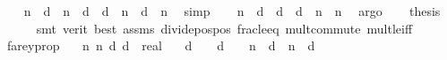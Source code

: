 \begin{isabellebody}
\ \ \isamarkupfalse%
\ {\isachardoublequoteopen}n{}\ {\isacharasterisk}{\kern0pt}\ d{}\ {\isacharplus}{\kern0pt}\ n{}\ {\isacharasterisk}{\kern0pt}\ d{}\ {\isacharless}{\kern0pt}\ d{}\ {\isacharasterisk}{\kern0pt}\ n{}\ {\isacharplus}{\kern0pt}\ d{}\ {\isacharasterisk}{\kern0pt}\ n{}{\isachardoublequoteclose}\ \isamarkupfalse%
\ simp\isanewline
\ \ \isamarkupfalse%
\ {\isachardoublequoteopen}n{}\ {\isacharasterisk}{\kern0pt}\ {\isacharparenleft}{\kern0pt}d{}\ {\isacharplus}{\kern0pt}\ d{}{\isacharparenright}{\kern0pt}\ {\isacharless}{\kern0pt}\ d{}\ {\isacharasterisk}{\kern0pt}\ {\isacharparenleft}{\kern0pt}n{}\ {\isacharplus}{\kern0pt}\ n{}{\isacharparenright}{\kern0pt}{\isachardoublequoteclose}\ \isamarkupfalse%
\ argo\isanewline
\ \ \isamarkupfalse%
\ {\isacharquery}{\kern0pt}thesis\isanewline
\ \ \ \ \isamarkupfalse%
\ {\isacharparenleft}{\kern0pt}smt\ {\isacharparenleft}{\kern0pt}verit{\isacharcomma}{\kern0pt}\ best{\isacharparenright}{\kern0pt}\ assms{\isacharparenleft}{\kern0pt}{}{\isacharcomma}{\kern0pt}{}{\isacharparenright}{\kern0pt}\ divide{\isacharunderscore}{\kern0pt}pos{\isacharunderscore}{\kern0pt}pos\ frac{\isacharunderscore}{\kern0pt}le{\isacharunderscore}{\kern0pt}eq\ mult{\isachardot}{\kern0pt}commute\ mult{\isacharunderscore}{\kern0pt}le{\isacharunderscore}{\kern0pt}{}{\isacharunderscore}{\kern0pt}iff{\isacharparenright}{\kern0pt}\isanewline
{}\isamarkupfalse%
%
\endisatagproof
{\isafoldproof}%
%
\isadelimproof
\isanewline
%
\endisadelimproof
\isanewline
{}\isamarkupfalse%
\ farey{\isacharunderscore}{\kern0pt}prop{}{\isacharcolon}{\kern0pt}\isanewline
\ \ \ n{}\ n{}\ d{}\ d{}\ {\isacharcolon}{\kern0pt}{\isacharcolon}{\kern0pt}\ real\isanewline
\ \ \ {\isachardoublequoteopen}d{}\ {\isachargreater}{\kern0pt}\ {}{\isachardoublequoteclose}\ \ {\isachardoublequoteopen}d{}\ {\isachargreater}{\kern0pt}\ {}{\isachardoublequoteclose}\ \ {\isachardoublequoteopen}n{}\ {\isacharslash}{\kern0pt}\ d{}\ {\isacharless}{\kern0pt}\ n{}\ {\isacharslash}{\kern0pt}\ d{}{\isachardoublequoteclose}\isanewline

\end{isabellebody}
